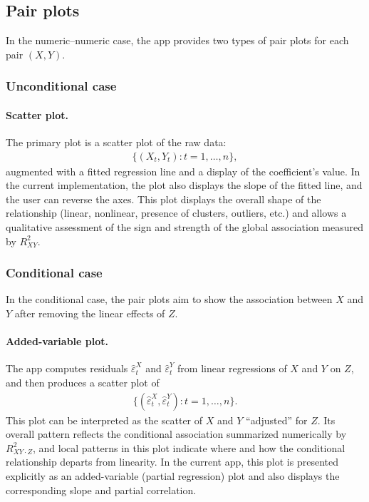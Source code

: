 \documentclass[11pt,a4paper]{article}
\begin{document}
\subsection{Pair plots}

In the numeric--numeric case, the app provides two types of pair plots for each pair $(X,Y)$.

\subsubsection*{Unconditional case}

\paragraph{Scatter plot.}
The primary plot is a scatter plot of the raw data:
\begin{align}
\{(X_t, Y_t): t = 1,\dots,n\},
\end{align}
augmented with a fitted regression line and a display of the coefficient's value. In the current implementation, the plot also displays the slope of the fitted line, and the user can reverse the axes. This plot displays the overall shape of the relationship (linear, nonlinear, presence of clusters, outliers, etc.) and allows a qualitative assessment of the sign and strength of the global association measured by $R^2_{XY}$.

\subsubsection*{Conditional case}

In the conditional case, the pair plots aim to show the association between $X$ and $Y$ after removing the linear effects of $Z$.

\paragraph{Added-variable plot.}
The app computes residuals $\hat{\varepsilon}^X_t$ and $\hat{\varepsilon}^Y_t$ from linear regressions of $X$ and $Y$ on $Z$, and then produces a scatter plot of
\begin{align}
\{(\hat{\varepsilon}^X_t, \hat{\varepsilon}^Y_t): t = 1,\dots,n\}.
\end{align}
This plot can be interpreted as the scatter of $X$ and $Y$ ``adjusted'' for $Z$. Its overall pattern reflects the conditional association summarized numerically by $R^2_{XY\cdot Z}$, and local patterns in this plot indicate where and how the conditional relationship departs from linearity. In the current app, this plot is presented explicitly as an added-variable (partial regression) plot and also displays the corresponding slope and partial correlation.
\end{document}
